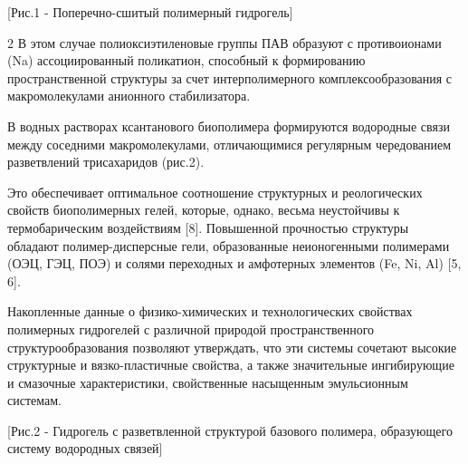 [Рис.1 - Поперечно-сшитый полимерный гидрогель]

\begin{multicols}{2}
В этом случае полиоксиэтиленовые группы ПАВ образуют с противоионами
(Na\tsp{+}) ассоциированный поликатион, способный к
формированию пространственной структуры за счет интерполимерного
комплексообразования с макромолекулами анионного стабилизатора.

В водных растворах ксантанового биополимера формируются водородные связи
между соседними макромолекулами, отличающимися регулярным чередованием
разветвлений трисахаридов (рис.2).

Это обеспечивает оптимальное соотношение структурных и реологических
свойств биополимерных гелей, которые, однако, весьма неустойчивы к
термобарическим воздействиям {[}8{]}. Повышенной прочностью структуры
обладают полимер-дисперсные гели, образованные неионогенными полимерами
(ОЭЦ, ГЭЦ, ПОЭ) и солями переходных и амфотерных элементов (Fe, Ni, Al)
{[}5, 6{]}.

Накопленные данные о физико-химических и технологических свойствах
полимерных гидрогелей с различной природой пространственного
структурообразования позволяют утверждать, что эти системы сочетают
высокие структурные и вязко-пластичные свойства, а также значительные
ингибирующие и смазочные характеристики, свойственные насыщенным
эмульсионным системам.
\end{multicols}

[Рис.2 - Гидрогель с разветвленной структурой базового полимера, образующего систему водородных связей]

